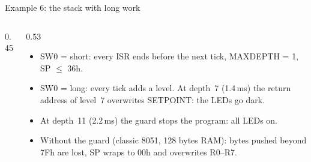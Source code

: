 \begin{frame}{Example 6: the stack with long work}
  \begin{columns}[T]
    \begin{column}{0.45\textwidth}
    \end{column}
    \begin{column}{0.53\textwidth}
      \begin{itemize}
        \item SW0 = short: every ISR ends before the next tick, MAXDEPTH = 1, SP $\le$ 36h.
        \item SW0 = long: every tick adds a level. At depth~7 (1.4\,ms) the return address of level~7 overwrites SETPOINT: the LEDs go dark.
        \item At depth~11 (2.2\,ms) the guard stops the program: all LEDs on.
        \item Without the guard (classic 8051, 128 bytes RAM): bytes pushed beyond 7Fh are lost, SP wraps to 00h and overwrites R0--R7.
      \end{itemize}
    \end{column}
  \end{columns}
\end{frame}

